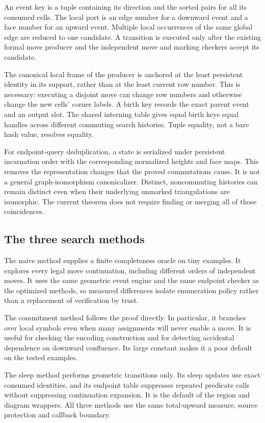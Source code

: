 An event key is a tuple containing its direction and the sorted pairs
 for all its consumed cells. The local
port is an edge number for a downward event and a face number for an upward
event. Multiple local occurrences of the same global edge are reduced to
one candidate. A transition is executed only after the existing formal move
producer and the independent move and marking checkers accept its candidate.

The canonical local frame of the producer is anchored at the least persistent
identity in its support, rather than at the least current row number. This
is necessary: executing a disjoint move can change row numbers and otherwise
change the new cells' corner labels. A birth key records the exact parent
event and an output slot. The shared interning table gives equal birth keys
equal handles across different commuting search histories. Tuple equality,
not a bare hash value, resolves equality.

For endpoint-query deduplication, a state is serialized under persistent
incarnation order with the corresponding normalized heights and face maps.
This removes the representation changes that the proved commutations cause.
It is not a general graph-isomorphism canonicalizer. Distinct, noncommuting
histories can remain distinct even when their underlying unmarked
triangulations are isomorphic. The current theorem does not require finding or merging
all of those coincidences.

\subsection{The three search methods}

The naive method supplies a finite completeness oracle on tiny examples.
It explores every legal move continuation, including different orders of
independent moves. It uses the same geometric event engine and the same
endpoint checker as the optimized methods, so measured differences isolate
enumeration policy rather than a replacement of verification by trust.

The commitment method follows the proof directly. In particular, it branches
over local symbols even when many assignments will never enable a move. It
is useful for checking the encoding construction and for detecting accidental
dependence on downward confluence. Its large constant makes it a poor default
on the tested examples.

The sleep method performs geometric transitions only. Its sleep updates use
exact consumed identities, and its endpoint table suppresses repeated
predicate calls without suppressing continuation expansion. It is the default
of the region and diagram wrappers. All three methods use the same
total-upward measure, source protection and callback boundary.

